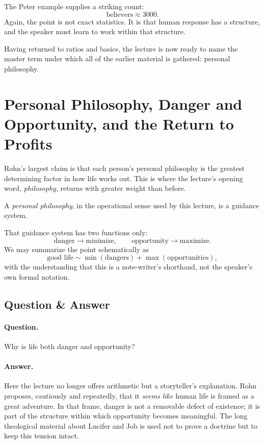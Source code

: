 The Peter example supplies a striking count:
\begin{equation}
\text{believers} \approx 3000.
\end{equation}
Again, the point is not exact statistics. It is that human response has a structure, and the speaker must learn to work within that structure.

Having returned to ratios and basics, the lecture is now ready to name the master term under which all of the earlier material is gathered: personal philosophy.

\section{Personal Philosophy, Danger and Opportunity, and the Return to Profits}

Rohn's largest claim is that each person's personal philosophy is the greatest determining factor in how life works out. This is where the lecture's opening word, \emph{philosophy}, returns with greater weight than before.

\begin{definition}
A \emph{personal philosophy}, in the operational sense used by this lecture, is a guidance system.
\end{definition}

That guidance system has two functions only:
\begin{equation}
\text{danger} \to \text{minimize}, \qquad \text{opportunity} \to \text{maximize}.
\end{equation}
We may summarize the point schematically as
\begin{equation}
\text{good life} \sim \min(\text{dangers})+\max(\text{opportunities}),
\end{equation}
with the understanding that this is a note-writer's shorthand, not the speaker's own formal notation.

\subsection{Question \& Answer}

\paragraph{Question.} Why is life both danger and opportunity?

\paragraph{Answer.} Here the lecture no longer offers arithmetic but a storyteller's explanation. Rohn proposes, cautiously and repeatedly, that it \emph{seems like} human life is framed as a great adventure. In that frame, danger is not a removable defect of existence; it is part of the structure within which opportunity becomes meaningful. The long theological material about Lucifer and Job is used not to prove a doctrine but to keep this tension intact.

